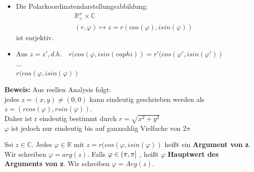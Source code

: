 \begin{itemize}
	\item
	Die Polarkoordinatendarstellungsabbildung:
	\begin{eqnarray*}
	\mathds{R}^x_+ \times \mathds{C} \\
	(r,\varphi) \mapsto z = r(cos(\varphi),i sin(\varphi))
	\end{eqnarray*}
	ist surjektiv.
	\item
	Aus $z = z', d.h.\quad r(cos(\varphi, i sin(vaphi)) = r'(cos(\varphi', i sin(\varphi'))$\\
	...\\$r(cos(\varphi, i sin(\varphi))$
\end{itemize}
\textbf{Beweis:}
Aus reellen Analysis folgt: \\
jedes $z = (x,y) \neq (0,0)$ kann eindeutig geschrieben werden als $z = (r cos(\varphi), rsin(\varphi))$. \\
Daher ist r eindeutig bestimmt durch $r = \sqrt{x^2 + y^2}$ \\
$\varphi$ ist jedoch nur eindeutig bis auf ganzzahlig Vielfache von $2\pi$

\begin{definition}
	Sei $z \in \mathds{C}$. Jedes $\varphi \in  \mathds{R}$ mit $z =r(cos(\varphi, i sin(\varphi))  $ heißt ein \textbf{Argument von z}. Wir schreiben $\varphi = arg(z)$.
	Falls $\varphi \in (\-\pi,\pi]$ , heißt $\varphi$ \textbf{Hauptwert des Arguments von z}. Wir schreiben $\varphi = Arg(z)$.
\end{definition}
